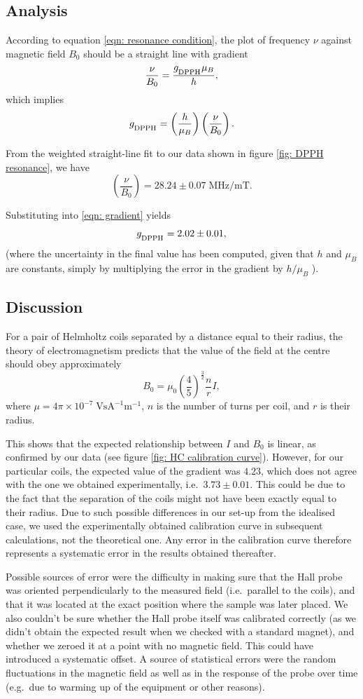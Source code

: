 \documentclass[a4paper]{jpconf}
\numberwithin{equation}{section}
\begin{document}
\subsection{Analysis}
According to equation \eqref{eqn: resonance condition}, the plot of frequency $\nu$ against magnetic field $B_0$ should be a straight line with gradient 
\[
	\frac{\nu}{B_0} = \frac{g_{\textsubscript{DPPH}} \mu_B}{h},
\]
which implies
\begin{equation} \label{eqn: gradient}
	g_{\textsubscript{DPPH}} = \left(\frac{h}{\mu_B}\right) \left(\frac{\nu}{B_0}\right). 
\end{equation}
	
From the weighted straight-line fit to our data shown in figure \ref{fig: DPPH resonance}, we have
\[
	\left(\frac{\nu}{B_0}\right) = 28.24 \pm 0.07 \; \si{\mega\hertz\per\milli\tesla}.
\]

Substituting into \eqref{eqn: gradient} yields 
\[
	g_{\textsubscript{DPPH}} = 2.02 \pm 0.01,
\] 
(where the uncertainty in the final value has been computed, given that $h$ and $\mu_B$ are constants, simply by multiplying the error in the gradient by $h / \mu_B$ ).

\subsection{Discussion}
For a pair of Helmholtz coils separated by a distance equal to their radius, the theory of electromagnetism predicts that the value of the field at the centre should obey approximately
\[
	B_0 = \mu_0 \left(\frac45\right)^{\tfrac32} \frac{n}{r} I,
\]
where $\mu = 4\pi\times10^{-7} \; \si{\volt\s\ampere\tothe{-1}\meter\tothe{-1}}$, $n$ is the number of turns per coil, and $r$ is their radius.

This shows that the expected relationship between $I$ and $B_0$ is linear, as confirmed by our data (see figure \ref{fig: HC calibration curve}).
However, for our particular coils, the expected value of the gradient was $4.23$, which does not agree with the one we obtained experimentally, i.e.\ $3.73 \pm 0.01$. This could be due to the fact that the separation of the coils might not have been exactly equal to their radius. Due to such possible differences in our set-up from the idealised case, we used the experimentally obtained calibration curve in subsequent calculations, not the theoretical one. Any error in the calibration curve therefore represents a systematic error in the results obtained thereafter.

Possible sources of error were the difficulty in making sure that the Hall probe was oriented perpendicularly to the measured field (i.e.\ parallel to the coils), and that it was located at the exact position where the sample was later placed. We also couldn't be sure whether the Hall probe itself was calibrated correctly (as we didn't obtain the expected result when we checked with a standard magnet), and whether we zeroed it at a point with no magnetic field. This could have introduced a systematic offset. A source of statistical errors were the random fluctuations in the magnetic field as well as in the response of the probe over time (e.g.\ due to warming up of the equipment or other reasons).
\end{document}
